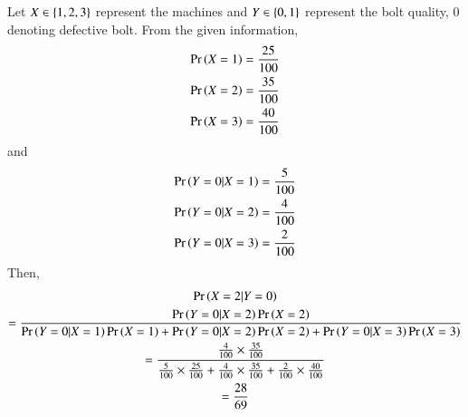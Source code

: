 Let $X \in \left\{1,2,3\right\}$ represent the machines and $Y \in \left\{0,1\right\}$ represent the bolt quality, 0 denoting defective bolt.  From the given information,
\begin{align}
\Pr\left(X=1\right) &= \frac{25}{100}
\\
\Pr\left(X=2\right) &= \frac{35}{100}
\\
\Pr\left(X=3\right) &= \frac{40}{100}
\end{align}
and
\begin{align}
\Pr\left(Y = 0|X=1\right) &= \frac{5}{100}
\\
\Pr\left(Y=0|X=2\right) &= \frac{4}{100}
\\
\Pr\left(Y=0|X=3\right) &= \frac{2}{100}
\end{align}
Then,
{\tiny
\begin{multline}
\Pr\left(X=2|Y=0\right) 
\\
= \frac{\Pr\left(Y=0|X=2\right)\Pr\left(X=2\right)}{\Pr\left(Y=0|X=1\right)\Pr\left(X=1\right)+\Pr\left(Y=0|X=2\right)\Pr\left(X=2\right)+\Pr\left(Y=0|X=3\right)\Pr\left(X=3\right)}
\\
=\frac{\frac{4}{100}\times\frac{35}{100}}{\frac{5}{100}\times\frac{25}{100}+\frac{4}{100}\times\frac{35}{100}+\frac{2}{100}\times\frac{40}{100}}
\\
=\frac{28}{69}
\end{multline}
}
